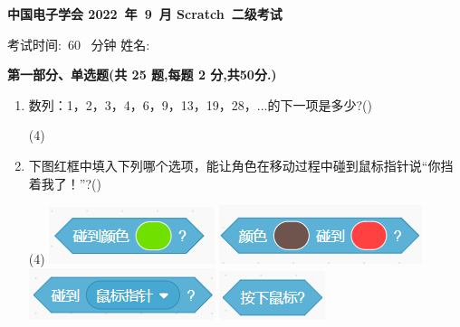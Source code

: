 \documentclass[10pt, a4paper]{article}
\newcommand{\Title}[3]{
    \begin{center}
        \Large \textbf{中国电子学会 #1~年~#2~月 Scratch~#3级考试}
    \end{center}
}
\newcommand{\TimeAndName}[1]{
    \begin{center}
        考试时间:~#1~ 分钟 \qquad\qquad\qquad\qquad 姓名:\underline{\quad\quad\quad\quad}
    \end{center}
}
\begin{document}
    \Title{2022}{9}{二} %
    \TimeAndName{60} %

    \vspace{2mm}
    {\noindent\textbf{第一部分、单选题(共 25 题,每题 2 分,共50分.)}}
    \begin{enumerate}
        \item 数列：1，2，3，4，6，9，13，19，28，...的下一项是多少?(\qquad)
        \begin{tasks}(4)
        \end{tasks}

        \item 下图红框中填入下列哪个选项，能让角色在移动过程中碰到鼠标指针说“你挡着我了！”?(\qquad)
        \begin{tasks}(4)
            \task \includegraphics[width=.16\textwidth]{2a.png}
            \task \includegraphics[width=.18\textwidth]{2b.png}
            \task \includegraphics[width=.18\textwidth]{2c.png}
            \task \includegraphics[width=.12\textwidth]{2d.png}
        \end{tasks}


\end{enumerate}
\end{document}
